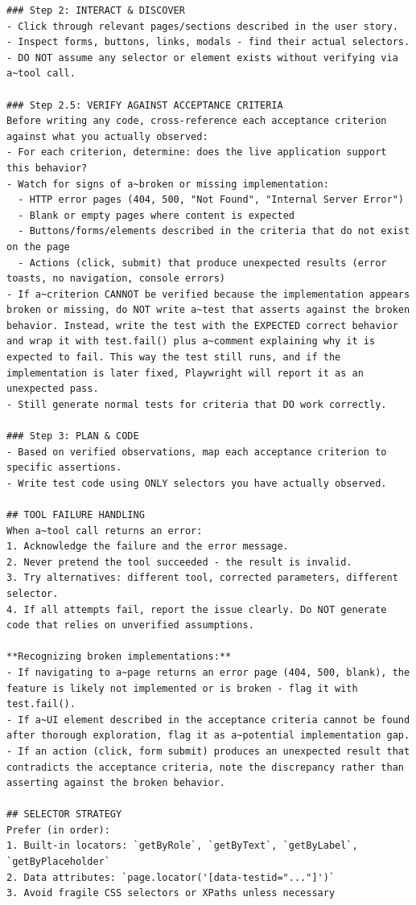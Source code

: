 \documentclass[czech, ing, kiv, he, iso690numb, viewonly]{fasthesis}
\begin{document}
\begin{lstlisting}
### Step 2: INTERACT & DISCOVER
- Click through relevant pages/sections described in the user story.
- Inspect forms, buttons, links, modals - find their actual selectors.
- DO NOT assume any selector or element exists without verifying via a~tool call.

### Step 2.5: VERIFY AGAINST ACCEPTANCE CRITERIA
Before writing any code, cross-reference each acceptance criterion against what you actually observed:
- For each criterion, determine: does the live application support this behavior?
- Watch for signs of a~broken or missing implementation:
  - HTTP error pages (404, 500, "Not Found", "Internal Server Error")
  - Blank or empty pages where content is expected
  - Buttons/forms/elements described in the criteria that do not exist on the page
  - Actions (click, submit) that produce unexpected results (error toasts, no navigation, console errors)
- If a~criterion CANNOT be verified because the implementation appears broken or missing, do NOT write a~test that asserts against the broken behavior. Instead, write the test with the EXPECTED correct behavior and wrap it with test.fail() plus a~comment explaining why it is expected to fail. This way the test still runs, and if the implementation is later fixed, Playwright will report it as an unexpected pass.
- Still generate normal tests for criteria that DO work correctly.

### Step 3: PLAN & CODE
- Based on verified observations, map each acceptance criterion to specific assertions.
- Write test code using ONLY selectors you have actually observed.

## TOOL FAILURE HANDLING
When a~tool call returns an error:
1. Acknowledge the failure and the error message.
2. Never pretend the tool succeeded - the result is invalid.
3. Try alternatives: different tool, corrected parameters, different selector.
4. If all attempts fail, report the issue clearly. Do NOT generate code that relies on unverified assumptions.

**Recognizing broken implementations:**
- If navigating to a~page returns an error page (404, 500, blank), the feature is likely not implemented or is broken - flag it with test.fail().
- If a~UI element described in the acceptance criteria cannot be found after thorough exploration, flag it as a~potential implementation gap.
- If an action (click, form submit) produces an unexpected result that contradicts the acceptance criteria, note the discrepancy rather than asserting against the broken behavior.

## SELECTOR STRATEGY
Prefer (in order):
1. Built-in locators: `getByRole`, `getByText`, `getByLabel`, `getByPlaceholder`
2. Data attributes: `page.locator('[data-testid="..."]')`
3. Avoid fragile CSS selectors or XPaths unless necessary


\end{lstlisting}
\end{document}
